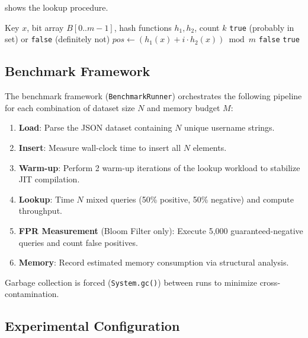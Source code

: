  shows the lookup procedure.

\begin{algorithm}[t]
\caption{Bloom Filter Membership Query}
\label{alg:bf_lookup}
\begin{algorithmic}[1]
\Require Key $x$, bit array $B[0..m{-}1]$, hash functions $h_1, h_2$, count $k$
\Ensure \texttt{true} (probably in set) or \texttt{false} (definitely not)
    \State $\mathit{pos} \gets (h_1(x) + i \cdot h_2(x)) \bmod m$
        \State \Return \texttt{false} 
    \EndIf
\EndFor
\State \Return \texttt{true} 
\end{algorithmic}
\end{algorithm}

\subsection{Benchmark Framework}
\label{subsec:benchmark}

The benchmark framework (\texttt{BenchmarkRunner}) orchestrates the following pipeline for each combination of dataset size $N$ and memory budget $M$:

\begin{enumerate}[nosep]
    \item \textbf{Load}: Parse the JSON dataset containing $N$ unique username strings.
    \item \textbf{Insert}: Measure wall-clock time to insert all $N$ elements.
    \item \textbf{Warm-up}: Perform 2 warm-up iterations of the lookup workload to stabilize JIT compilation.
    \item \textbf{Lookup}: Time $N$ mixed queries (50\% positive, 50\% negative) and compute throughput.
    \item \textbf{FPR Measurement} (Bloom Filter only): Execute 5{,}000 guaranteed-negative queries and count false positives.
    \item \textbf{Memory}: Record estimated memory consumption via structural analysis.
\end{enumerate}

Garbage collection is forced (\texttt{System.gc()}) between runs to minimize cross-contamination.

\subsection{Experimental Configuration}
\label{subsec:config}

